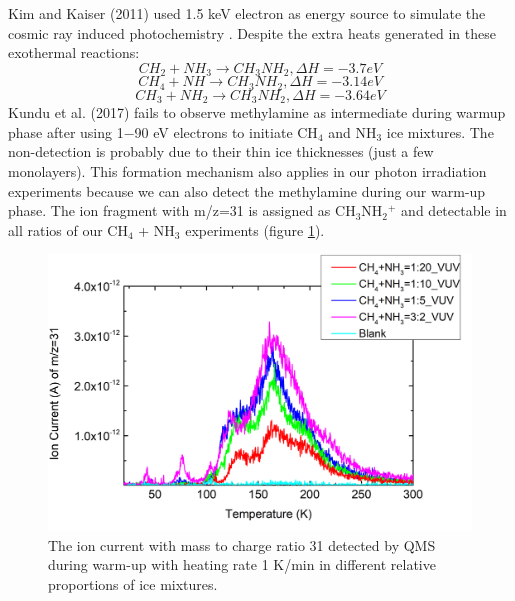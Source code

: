 Kim and Kaiser (2011) used 1.5 keV electron as energy source to simulate the cosmic ray induced photochemistry \cite{kim}. Despite the extra heats generated in these exothermal reactions:
\begin{equation}
CH_2 + NH_3 \rightarrow CH_3NH_2, \Delta H = -3.7 eV
\label{eq:methylamine_1}
\end{equation}
\begin{equation}
CH_4 + NH \rightarrow CH_3NH_2, \Delta H = -3.14 eV
\label{eq:methylamine_2}
\end{equation}
\begin{equation}
CH_3 + NH_2 \rightarrow CH_3NH_2, \Delta H = -3.64 eV
\label{eq:methylamine_3}
\end{equation}
Kundu et al. (2017) fails to observe methylamine as intermediate during warmup phase after using 1$-$90 eV electrons to initiate CH$_4$ and NH$_3$ ice mixtures\cite{kundu2017electron}. The non-detection is probably due to their thin ice thicknesses (just a few monolayers). This formation mechanism also applies in our photon irradiation experiments because we can also detect the methylamine during our warm-up phase. The ion fragment with m/z=31 is assigned as CH$_3$NH$_2$$^+$ and detectable in all ratios of our CH$_4$ + NH$_3$ experiments (figure \ref{Mass31}).\\

\begin{figure}
\centering
\includegraphics[width=\textwidth]{figures/chapter3/mass31.png}
\caption{The ion current with mass to charge ratio 31 detected by QMS during warm-up with heating rate 1 K/min in different relative proportions of ice mixtures.}
\label{Mass31}
\end{figure}

